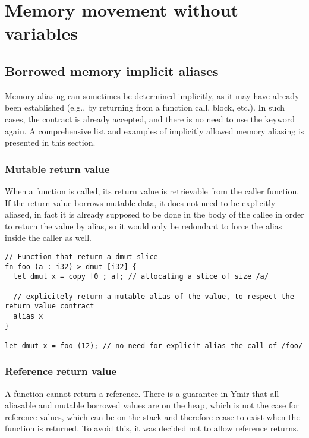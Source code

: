 \section {Memory movement without variables}
\subsection{Borrowed memory implicit aliases}

Memory aliasing can sometimes be determined implicitly, as it may have already
been established (e.g., by returning from a function call, block, etc.). In such
cases, the contract is already accepted, and there is no need to use the keyword
 again. A comprehensive list and examples of implicitly allowed
memory aliasing is presented in this section.

\subsubsection*{Mutable return value}

When a function is called, its return value is retrievable from the caller
function. If the return value borrows mutable data, it does not need to be
explicitly aliased, in fact it is already supposed to be done in the body of the
callee in order to return the value by alias, so it would only be redondant to
force the alias inside the caller as well.

\begin{lstlisting}[style=coloredverbatim]
// Function that return a dmut slice
fn foo (a : i32)-> dmut [i32] {
  let dmut x = copy [0 ; a]; // allocating a slice of size /a/

  // explicitely return a mutable alias of the value, to respect the return value contract
  alias x
}

let dmut x = foo (12); // no need for explicit alias the call of /foo/
\end{lstlisting}

\subsubsection*{Reference return value}

A function cannot return a reference. There is a guarantee in Ymir that all
aliasable and mutable borrowed values are on the heap, which is not the case for
reference values, which can be on the stack and therefore cease to exist when
the function is returned. To avoid this, it was decided not to allow reference
returns.

